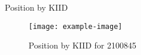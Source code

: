 \documentclass{beamer}
\begin{document}
\begin{frame}{Position by KIID}
\begin{figure}
\texttt{[image: example-image]}
\caption{Position by KIID for 2100845}
\end{figure}
\end{frame}
\end{document}
